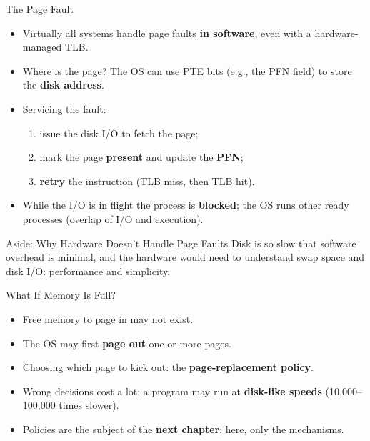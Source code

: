 \begin{frame}{The Page Fault}
\small

\begin{itemize}
    \item Virtually all systems handle page faults \textbf{in software},
          even with a hardware-managed TLB.
    \item Where is the page? The OS can use PTE bits (e.g., the PFN field)
          to store the \textbf{disk address}.
    \item Servicing the fault:
    \begin{enumerate}
        \item issue the disk I/O to fetch the page;
        \item mark the page \textbf{present} and update the \textbf{PFN};
        \item \textbf{retry} the instruction (TLB miss, then TLB hit).
    \end{enumerate}
    \item While the I/O is in flight the process is \textbf{blocked};
          the OS runs other ready processes (overlap of I/O and execution).
\end{itemize}

\begin{block}{Aside: Why Hardware Doesn't Handle Page Faults}
Disk is so slow that software overhead is minimal, and the hardware would
need to understand swap space and disk I/O: performance and simplicity.
\end{block}

\end{frame}

\begin{frame}{What If Memory Is Full?}

\begin{itemize}
    \item Free memory to page in may not exist.
    \item The OS may first \textbf{page out} one or more pages.
    \item Choosing which page to kick out: the
          \textbf{page-replacement policy}.
    \item Wrong decisions cost a lot: a program may run at
          \textbf{disk-like speeds} (10,000--100,000 times slower).
    \item Policies are the subject of the \textbf{next chapter}; here, only
          the mechanisms.
\end{itemize}

\end{frame}

